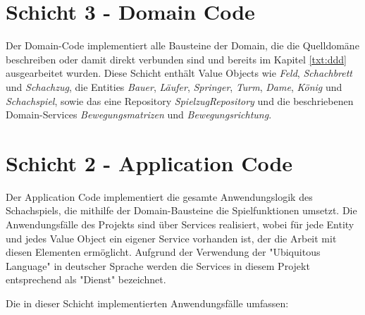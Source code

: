 \section{Schicht 3 - Domain Code}

Der Domain-Code implementiert alle Bausteine der Domain, die die Quelldomäne beschreiben oder damit direkt verbunden sind und bereits im Kapitel \ref{txt:ddd} ausgearbeitet wurden. 
Diese Schicht enthält Value Objects wie \textit{Feld}, \textit{Schachbrett} und \textit{Schachzug}, die Entities \textit{Bauer}, \textit{Läufer}, \textit{Springer}, \textit{Turm}, \textit{Dame}, \textit{König} und \textit{Schachspiel}, sowie das eine Repository \textit{SpielzugRepository} und die beschriebenen Domain-Services \textit{Bewegungsmatrizen} und \textit{Bewegungsrichtung}.

\section{Schicht 2 - Application Code}

Der Application Code implementiert die gesamte Anwendungslogik des Schachspiels, die mithilfe der Domain-Bausteine die Spielfunktionen umsetzt. 
Die Anwendungsfälle des Projekts sind über Services realisiert, wobei für jede Entity und jedes Value Object ein eigener Service vorhanden ist, der die Arbeit mit diesen Elementen ermöglicht. 
Aufgrund der Verwendung der "Ubiquitous Language" in deutscher Sprache werden die Services in diesem Projekt entsprechend als "Dienst" bezeichnet.

Die in dieser Schicht implementierten Anwendungsfälle umfassen:

